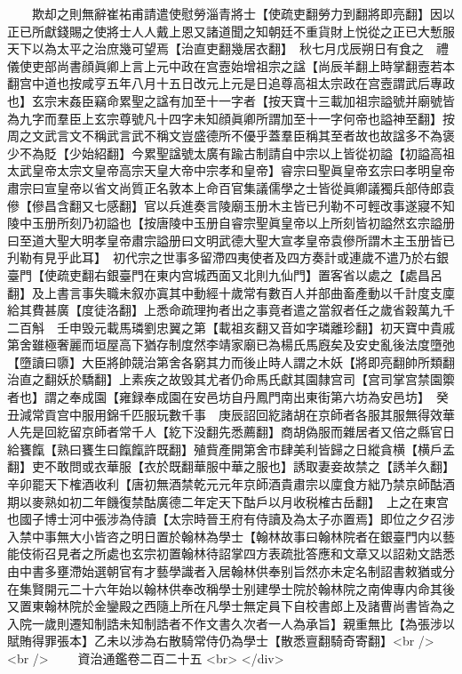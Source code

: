 　　欺却之則無辭崔祐甫請遣使慰勞淄青將士【使疏吏翻勞力到翻將即亮翻】因以正已所獻錢賜之使將士人人戴上恩又諸道聞之知朝廷不重貨財上悦從之正已大慙服天下以為太平之治庶幾可望焉【治直吏翻幾居衣翻】　秋七月戊辰朔日有食之　禮儀使吏部尚書顔眞卿上言上元中政在宫壼始增祖宗之諡【尚辰羊翻上時掌翻壼若本翻宫中道也按咸亨五年八月十五日改元上元是日追尊高祖太宗政在宫壼謂武后專政也】玄宗末姦臣竊命累聖之諡有加至十一字者【按天寶十三載加祖宗謚號并廟號皆為九字而羣臣上玄宗尊號凡十四字未知顔眞卿所謂加至十一字何帝也謚神至翻】按周之文武言文不稱武言武不稱文豈盛德所不優乎蓋羣臣稱其至者故也故諡多不為褒少不為貶【少始紹翻】今累聖諡號太廣有踰古制請自中宗以上皆從初謚【初謚高祖太武皇帝太宗文皇帝高宗天皇大帝中宗孝和皇帝】睿宗曰聖眞皇帝玄宗曰孝明皇帝肅宗曰宣皇帝以省文尚質正名敦本上命百官集議儒學之士皆從眞卿議獨兵部侍郎袁傪【傪昌含翻又七感翻】官以兵進奏言陵廟玉册木主皆已刋勒不可輕改事遂寢不知陵中玉册所刻乃初謚也【按唐陵中玉册自睿宗聖眞皇帝以上所刻皆初謚然玄宗謚册曰至道大聖大明孝皇帝肅宗謚册曰文明武德大聖大宣孝皇帝袁傪所謂木主玉册皆已刋勒有見乎此耳】　初代宗之世事多留滯四夷使者及四方奏計或連歲不遣乃於右銀臺門【使疏吏翻右銀臺門在東内宫城西面又北則九仙門】置客省以處之【處昌呂翻】及上書言事失職未叙亦寘其中動經十歲常有數百人并部曲畜產動以千計度支廩給其費甚廣【度徒洛翻】上悉命疏理拘者出之事竟者遣之當叙者任之歲省穀萬九千二百斛　壬申毁元載馬璘劉忠翼之第【載祖亥翻又音如字璘離珍翻】初天寶中貴戚第舍雖極奢麗而垣屋高下猶存制度然李靖家廟已為楊氏馬廐矣及安史亂後法度墮弛【墮讀曰隳】大臣將帥競治第舍各窮其力而後止時人謂之木妖【將即亮翻帥所類翻治直之翻妖於驕翻】上素疾之故毁其尤者仍命馬氏獻其園隸宫司【宫司掌宫禁園籞者也】謂之奉成園【雍録奉成園在安邑坊自丹鳳門南出東街第六坊為安邑坊】　癸丑減常貢宫中服用錦千匹服玩數千事　庚辰詔回紇諸胡在京師者各服其服無得效華人先是回紇留京師者常千人【紇下没翻先悉薦翻】商胡偽服而雜居者又倍之縣官日給饔餼【熟曰饔生曰餼餼許既翻】殖貲產開第舍市肆美利皆歸之日縱貪横【横戶孟翻】吏不敢問或衣華服【衣於既翻華服中華之服也】誘取妻妾故禁之【誘羊久翻】　辛卯罷天下榷酒收利【唐初無酒禁乾元元年京師酒貴肅宗以廩食方絀乃禁京師酤酒期以麥熟如初二年饑復禁酤廣德二年定天下酤戶以月收税榷古岳翻】　上之在東宫也國子博士河中張涉為侍讀【太宗時晉王府有侍讀及為太子亦置焉】即位之夕召涉入禁中事無大小皆咨之明日置於翰林為學士【翰林故事曰翰林院者在銀臺門内以藝能伎術召見者之所處也玄宗初置翰林待詔掌四方表疏批答應和文章又以詔勑文誥悉由中書多壅滯始選朝官有才藝學識者入居翰林供奉别旨然亦未定名制詔書敕猶或分在集賢開元二十六年始以翰林供奉改稱學士别建學士院於翰林院之南俾專内命其後又置東翰林院於金鑾殿之西隨上所在凡學士無定員下自校書郎上及諸曹尚書皆為之入院一歲則遷知制誥未知制誥者不作文書久次者一人為承旨】親重無比【為張涉以賦賄得罪張本】乙未以涉為右散騎常侍仍為學士【散悉亶翻騎奇寄翻】<br />
<br />
　　資治通鑑卷二百二十五  <br>
   </div> 

